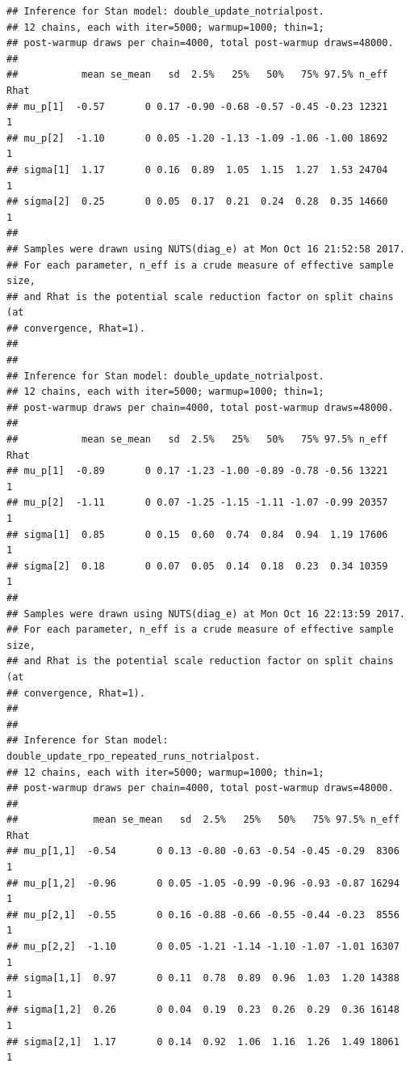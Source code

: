 \documentclass{article}\usepackage[]{graphicx}\usepackage[]{color}
\makeatletter
\newenvironment{kframe}{%
 \def\at@end@of@kframe{}%
 \ifinner\ifhmode%
  \def\at@end@of@kframe{\end{minipage}}%
  \begin{minipage}{\columnwidth}%
 \fi\fi%
 \def\FrameCommand##1{\hskip\@totalleftmargin \hskip-\fboxsep
 \colorbox{shadecolor}{##1}\hskip-\fboxsep
     \hskip-\linewidth \hskip-\@totalleftmargin \hskip\columnwidth}%
 \MakeFramed {\advance\hsize-\width
   \@totalleftmargin\z@ \linewidth\hsize
   \@setminipage}}%
 {\par\unskip\endMakeFramed%
 \at@end@of@kframe}
\newenvironment{knitrout}{}{} %
\makeatother
\begin{document}
\begin{knitrout}
\color{fgcolor}\begin{kframe}
\begin{verbatim}
## Inference for Stan model: double_update_notrialpost.
## 12 chains, each with iter=5000; warmup=1000; thin=1; 
## post-warmup draws per chain=4000, total post-warmup draws=48000.
## 
##           mean se_mean   sd  2.5%   25%   50%   75% 97.5% n_eff Rhat
## mu_p[1]  -0.57       0 0.17 -0.90 -0.68 -0.57 -0.45 -0.23 12321    1
## mu_p[2]  -1.10       0 0.05 -1.20 -1.13 -1.09 -1.06 -1.00 18692    1
## sigma[1]  1.17       0 0.16  0.89  1.05  1.15  1.27  1.53 24704    1
## sigma[2]  0.25       0 0.05  0.17  0.21  0.24  0.28  0.35 14660    1
## 
## Samples were drawn using NUTS(diag_e) at Mon Oct 16 21:52:58 2017.
## For each parameter, n_eff is a crude measure of effective sample size,
## and Rhat is the potential scale reduction factor on split chains (at 
## convergence, Rhat=1).
## 
## 
## Inference for Stan model: double_update_notrialpost.
## 12 chains, each with iter=5000; warmup=1000; thin=1; 
## post-warmup draws per chain=4000, total post-warmup draws=48000.
## 
##           mean se_mean   sd  2.5%   25%   50%   75% 97.5% n_eff Rhat
## mu_p[1]  -0.89       0 0.17 -1.23 -1.00 -0.89 -0.78 -0.56 13221    1
## mu_p[2]  -1.11       0 0.07 -1.25 -1.15 -1.11 -1.07 -0.99 20357    1
## sigma[1]  0.85       0 0.15  0.60  0.74  0.84  0.94  1.19 17606    1
## sigma[2]  0.18       0 0.07  0.05  0.14  0.18  0.23  0.34 10359    1
## 
## Samples were drawn using NUTS(diag_e) at Mon Oct 16 22:13:59 2017.
## For each parameter, n_eff is a crude measure of effective sample size,
## and Rhat is the potential scale reduction factor on split chains (at 
## convergence, Rhat=1).
## 
## 
## Inference for Stan model: double_update_rpo_repeated_runs_notrialpost.
## 12 chains, each with iter=5000; warmup=1000; thin=1; 
## post-warmup draws per chain=4000, total post-warmup draws=48000.
## 
##             mean se_mean   sd  2.5%   25%   50%   75% 97.5% n_eff Rhat
## mu_p[1,1]  -0.54       0 0.13 -0.80 -0.63 -0.54 -0.45 -0.29  8306    1
## mu_p[1,2]  -0.96       0 0.05 -1.05 -0.99 -0.96 -0.93 -0.87 16294    1
## mu_p[2,1]  -0.55       0 0.16 -0.88 -0.66 -0.55 -0.44 -0.23  8556    1
## mu_p[2,2]  -1.10       0 0.05 -1.21 -1.14 -1.10 -1.07 -1.01 16307    1
## sigma[1,1]  0.97       0 0.11  0.78  0.89  0.96  1.03  1.20 14388    1
## sigma[1,2]  0.26       0 0.04  0.19  0.23  0.26  0.29  0.36 16148    1
## sigma[2,1]  1.17       0 0.14  0.92  1.06  1.16  1.26  1.49 18061    1

\end{verbatim}
\end{kframe}
\end{knitrout}
\end{document}
